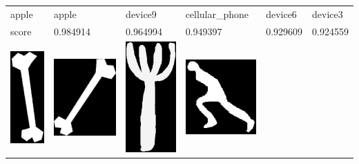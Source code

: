 \begin{table}[h!]
\begin{tabular}{ | m{2.2cm} | m{2.2cm} | m{2.2cm} | m{2.2cm} | m{2.2cm} | m{2.2cm} | }
\begin{minipage}{.3\textwidth}
    \end{minipage}
	\\ \hline
	apple & apple & device9 & cellular\_phone & device6 & device3 \\ \hline
	score & 0.984914 & 0.964994 & 0.949397 & 0.929609 & 0.924559 \\ \hline
	\begin{minipage}{.3\textwidth}
      \includegraphics[width=\linewidth, width=20mm]{images/test-bone}
    \end{minipage}
    &
    \begin{minipage}{.3\textwidth}
      \includegraphics[width=\linewidth, width=20mm]{images/bone}
    \end{minipage}
    & 
    \begin{minipage}{.3\textwidth}
      \includegraphics[width=\linewidth, width=20mm]{images/fork}
    \end{minipage}
	&
	\begin{minipage}{.3\textwidth}
      \includegraphics[width=\linewidth, width=20mm]{images/stef}

\end{minipage}
\end{tabular}
\end{table}
